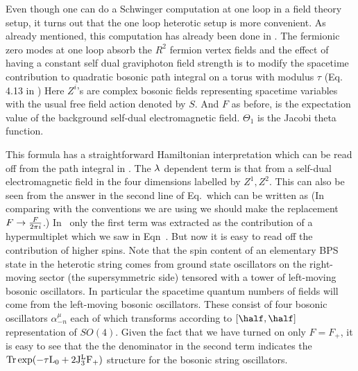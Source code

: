 Even though one can do a Schwinger computation at one loop in
a field theory setup,
it turns out that the one loop heterotic setup is more convenient.
As already mentioned, this computation has already been done in \narcon .
The fermionic zero modes at one loop absorb the $R^2$ fermion
vertex fields and the effect of having a constant self
dual graviphoton field strength is to modify the spacetime
contribution to quadratic
bosonic
path integral on a torus with modulus $\tau$ (Eq. 4.13 in \narcon )
%
\eqn{}
%
Here $Z^i$'s are complex bosonic fields representing spacetime variables
with the usual free field action
denoted by
$S$. And $F$ as before, is the expectation value of the background self-dual
electromagnetic field. $\Theta_1$ is the Jacobi theta function.

This formula has a straightforward Hamiltonian interpretation which can be
read off from the path integral in \narpath . The $\lambda$ dependent term
is that from a self-dual electromagnetic field in the four dimensions
labelled by $Z^1, Z^2$. This can also be seen from the answer in the
second line of Eq.\narpath\ which can be written as
%
\eqn{}
%
(In
comparing with the conventions we are using we should make the replacement
$F\rightarrow {F\over 2\pi i}$.)
In \narcon\ only the first term was extracted as the
contribution of a hypermultiplet which we saw in Eqn\schw\ .
But now it is easy to read off the contribution of
higher spins.  Note that the spin content of an elementary
BPS state in the heterotic string comes from ground state
oscillators on the right-moving sector (the supersymmetric side)
tensored with a tower of left-moving bosonic oscillators. In particular
the spacetime quantum numbers of fields will come from the
left-moving bosonic oscillators.
These consist of four bosonic oscillators $\alpha_{-n}^\mu$ each
of which transforms according to $[\half,\half]$ representation
of $SO(4)$.  Given the fact that we have turned on only
$F=F_+$, it is easy to see that the
the denominator in the second term
indicates the $\rm{Tr}\exp(-\tau L_0+2J_3^L F_+)$ structure for
the bosonic string oscillators.

